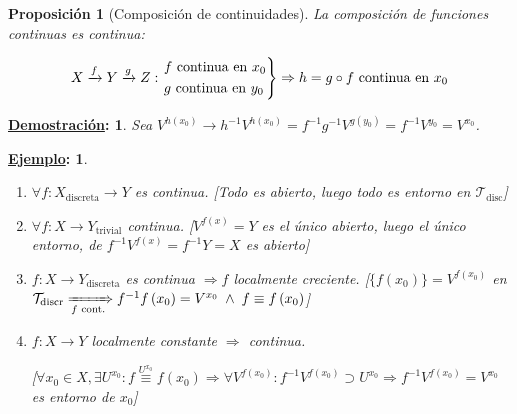 \documentclass[10pt,a4paper,openright]{book}
\theoremstyle{break}
\newtheorem*{prop}{Proposición}
\newtheorem*{demo}{\underline{Demostración}:}
\newtheorem*{ej}{\underline{Ejemplo}:}
\begin{document}
\begin{prop}[Composición de continuidades]
La composición de funciones continuas es continua:

\[
X \xrightarrow{f} Y \xrightarrow{g} Z: \begin{rcases}
    f \text{ continua en } x_0\\
    g \text{ continua en } y_0
\end{rcases} \Rightarrow h = g \circ f \text{ continua en }  x_0
\]
\end{prop}
\begin{demo}
Sea $V^{h\left( x_0 \right)} \rightarrow h^{-1} V^{h\left( x_0 \right)} = f^{-1}g^{-1}V^{g\left( y_0 \right)} = f^{-1} V^{y_0} = V^{x_0}$.
\end{demo}

\begin{ej}
\begin{enumerate}
    \item $\forall f: X_{\text{discreta}} \rightarrow Y$ es continua. [Todo es abierto, luego todo es entorno en $\mathcal{T}_{\text{disc}}$]
    \item $\forall f: X \rightarrow Y_{\text{trivial}}$ continua. [$V^{f\left( x \right)} = Y$ es el único abierto, luego el único entorno, de $f^{-1}V^{f\left( x \right)} = f^{-1}Y = X$ es abierto]
    \item $f: X \rightarrow Y_{\text{discreta}}$ es continua $\Rightarrow f$ localmente creciente.
        [$\{f\left( x_0 \right)\} = V^{f\left( x_0 \right)}$ en $\mathcal{T}_{\text{discr}} \xRightarrow[f\text{ cont.}]{} f^{-1}f\left( x_0 \right) = V^{x_0}\; \land \;f \equiv f\left( x_0 \right)$]
    \item $f: X \rightarrow Y$ localmente constante $\Rightarrow$ continua.

    [$\forall x_0 \in X, \exists U^{x_0} : f \stackrel{U^{x_0}}{\equiv} f\left( x_0 \right) \Rightarrow \forall V^{f\left( x_0 \right)}: f^{-1}V^{f\left( x_0 \right)} \supset U^{x_0} \Rightarrow f^{-1}V^{f\left( x_0 \right)} = V^{x_0}$ es entorno de $x_0$]
\end{enumerate}
\end{ej}
\end{document}
